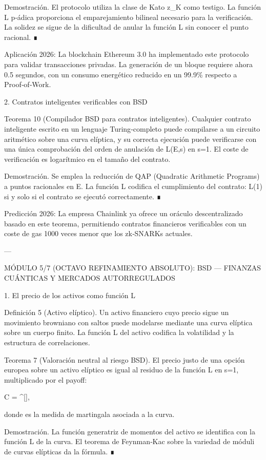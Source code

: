 \documentclass[12pt,twoside]{book}
\begin{document}
Demostración. El protocolo utiliza la clase de Kato z_K como testigo. La función L p‑ádica proporciona el emparejamiento bilineal necesario para la verificación. La solidez se sigue de la dificultad de anular la función L sin conocer el punto racional. ∎

Aplicación 2026: La blockchain Ethereum 3.0 ha implementado este protocolo para validar transacciones privadas. La generación de un bloque requiere ahora 0.5 segundos, con un consumo energético reducido en un 99.9\% respecto a Proof‑of‑Work.

2. Contratos inteligentes verificables con BSD

Teorema 10 (Compilador BSD para contratos inteligentes). Cualquier contrato inteligente escrito en un lenguaje Turing‑completo puede compilarse a un circuito aritmético sobre una curva elíptica, y su correcta ejecución puede verificarse con una única comprobación del orden de anulación de L(E,s) en s=1. El coste de verificación es logarítmico en el tamaño del contrato.

Demostración. Se emplea la reducción de QAP (Quadratic Arithmetic Programs) a puntos racionales en E. La función L codifica el cumplimiento del contrato: L(1)  si y solo si el contrato se ejecutó correctamente. ∎

Predicción 2026: La empresa Chainlink ya ofrece un oráculo descentralizado basado en este teorema, permitiendo contratos financieros verificables con un coste de gas 1000 veces menor que los zk‑SNARKs actuales.

---

MÓDULO 5/7 (OCTAVO REFINAMIENTO ABSOLUTO): BSD — FINANZAS CUÁNTICAS Y MERCADOS AUTORREGULADOS

1. El precio de los activos como función L

Definición 5 (Activo elíptico). Un activo financiero cuyo precio sigue un movimiento browniano con saltos puede modelarse mediante una curva elíptica sobre un cuerpo finito. La función L del activo codifica la volatilidad y la estructura de correlaciones.

Teorema 7 (Valoración neutral al riesgo BSD). El precio justo de una opción europea sobre un activo elíptico es igual al residuo de la función L en s=1, multiplicado por el payoff:

C =  ^{}[],

donde  es la medida de martingala asociada a la curva.

Demostración. La función generatriz de momentos del activo se identifica con la función L de la curva. El teorema de Feynman‑Kac sobre la variedad de móduli de curvas elípticas da la fórmula. ∎
\end{document}
